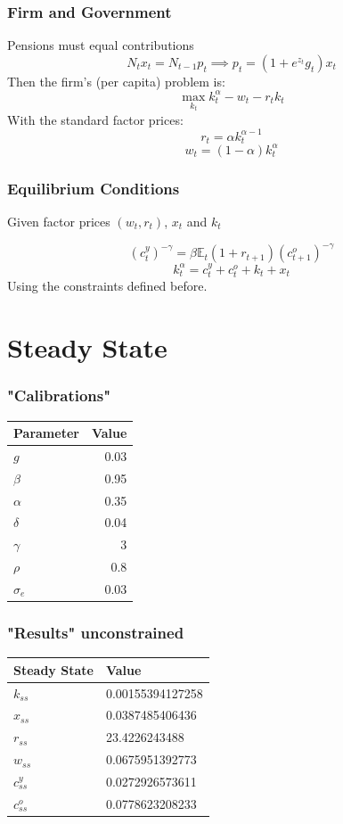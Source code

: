 \documentclass[11pt]{beamer}
\theoremstyle{definition}
\begin{document}
\begin{frame}
    \frametitle{Firm and Government}
    Pensions must equal contributions
    \[N_t x_t = N_{t-1} p_t \implies p_t = (1+e^{z_t}g_t)x_t\]
    Then the firm's (per capita) problem is:
    \[\max_{k_t} k_t^\alpha -w_t -r_t k_t\]
    With the standard factor prices:
    \[r_t = \alpha k_t^{\alpha-1}\]
    \[w_t = (1-\alpha)k_t^{\alpha}\]

\end{frame}

\begin{frame}
    \frametitle{Equilibrium Conditions}
    Given factor prices $(w_t,r_t)$, $x_t$ and $k_t$ %

    \[(c_t^y)^{-\gamma}=\beta \mathds{E}_t(1+r_{t+1})(c_{t+1}^o)^{-\gamma}\]
    \[k_t^\alpha = c_t^y + c_{t}^o + k_t +x_t\]
    Using the constraints defined before.

\end{frame}

\section{Steady State} 
\begin{frame}
    \frametitle{"Calibrations"}
    \begin{table}
\begin{tabular}{lr}
\toprule
{Parameter} & Value \\
\midrule
$g$  &  0.03 \\
$\beta$  &  0.95 \\
$\alpha$  &  0.35\\
$\delta$  &  0.04\\
$\gamma$  &  3 \\
$\rho$ & 0.8 \\
$\sigma_e$& 0.03\\
\bottomrule
\end{tabular}
\end{table}

\end{frame}

\begin{frame}
    \frametitle{"Results" unconstrained}
\begin{table}[]
\centering
\label{my-label}
\begin{tabular}{|l|l|}
\hline
Steady State  & Value   \\ \hline
$k_{ss}$           & 0.00155394127258     \\ \hline
$x_{ss}$           & 0.0387485406436 \\ \hline
$r_{ss}$           & 23.4226243488    \\ \hline
$w_{ss}$           & 0.0675951392773     \\ \hline
$c^y_{ss}$         & 0.0272926573611   \\ \hline
$c^o_{ss}$         & 0.0778623208233     \\ \hline
\end{tabular}
\end{table}

\end{frame}
\end{document}
